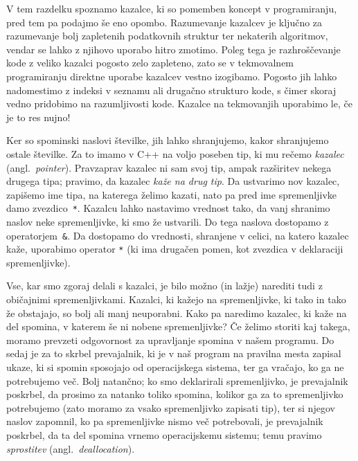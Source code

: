 
V tem razdelku spoznamo kazalce, ki so pomemben koncept v programiranju, pred
tem pa podajmo še eno opombo.
Razumevanje kazalcev je ključno za razumevanje bolj zapletenih podatkovnih
struktur ter nekaterih algoritmov, vendar se lahko z njihovo uporabo hitro
zmotimo.
Poleg tega je razhroščevanje kode z veliko kazalci pogosto zelo zapleteno, zato
se v tekmovalnem programiranju direktne uporabe kazalcev vestno izogibamo.
Pogosto jih lahko nadomestimo z indeksi v seznamu ali drugačno strukturo kode, s
čimer skoraj vedno pridobimo na razumljivosti kode.
Kazalce na tekmovanjih uporabimo le, če je to res nujno!

Ker so spominski naslovi številke, jih lahko shranjujemo, kakor shranjujemo
ostale številke.
Za to imamo v C++ na voljo poseben tip, ki mu rečemo \emph{kazalec}
(angl.~\textit{pointer}).
Pravzaprav kazalec ni sam svoj tip, ampak razširitev nekega drugega tipa;
pravimo, da kazalec \emph{kaže na drug tip}.
Da ustvarimo nov kazalec, zapišemo ime tipa, na katerega želimo kazati,
nato pa pred ime spremenljivke damo zvezdico~\verb+*+.
Kazalcu lahko nastavimo vrednost tako, da vanj shranimo naslov neke
spremenljivke, ki smo že ustvarili.
Do tega naslova dostopamo z operatorjem~\verb+&+.
Da dostopamo do vrednosti, shranjene v celici, na katero kazalec kaže,
uporabimo operator \verb+*+ (ki ima drugačen pomen, kot zvezdica v deklaraciji
spremenljivke).


Vse, kar smo zgoraj delali s kazalci, je bilo možno (in lažje) narediti tudi z
običajnimi spremenljivkami.
Kazalci, ki kažejo na spremenljivke, ki tako in tako že obstajajo, so bolj ali
manj neuporabni.
Kako pa naredimo kazalec, ki kaže na del spomina, v katerem še ni nobene
spremenljivke?
Če želimo storiti kaj takega, moramo prevzeti odgovornost za upravljanje spomina
v našem programu.
Do sedaj je za to skrbel prevajalnik, ki je v naš program na pravilna mesta
zapisal ukaze, ki si spomin sposojajo od operacijskega sistema, ter ga vračajo,
ko ga ne potrebujemo več.
Bolj natančno; ko smo deklarirali spremenljivko, je prevajalnik poskrbel, da
prosimo za natanko toliko spomina, kolikor ga za to spremenljivko potrebujemo
(zato moramo za vsako spremenljivko zapisati tip), ter si njegov naslov
zapomnil, ko pa spremenljivke nismo več potrebovali, je prevajalnik poskrbel, da
ta del spomina vrnemo operacijskemu sistemu; temu pravimo \emph{sprostitev}
(angl.~\textit{deallocation}).

